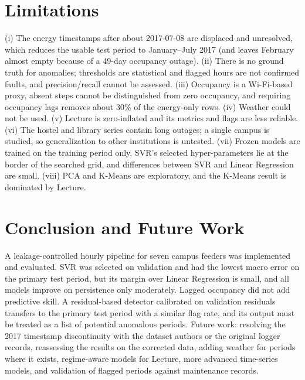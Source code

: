 \documentclass[conference]{IEEEtran}
\begin{document}
\section{Limitations}
(i) The energy timestamps after about 2017-07-08 are displaced and unresolved, which reduces the usable test period to January--July 2017 (and leaves February almost empty because of a 49-day occupancy outage).
(ii) There is no ground truth for anomalies; thresholds are statistical and flagged hours are not confirmed faults, and precision/recall cannot be assessed. (iii) Occupancy is a Wi-Fi-based proxy, absent steps cannot be distinguished from zero occupancy, and requiring occupancy lags removes about 30\% of the energy-only rows.
(iv) Weather could not be used. (v) Lecture is zero-inflated and its metrics and flags are less reliable. (vi) The hostel and library series contain long outages; a single campus is studied, so generalization to other institutions is untested.
(vii) Frozen models are trained on the training period only, SVR's selected hyper-parameters lie at the border of the searched grid, and differences between SVR and Linear Regression are small. (viii) PCA and K-Means are exploratory, and the K-Means result is dominated by Lecture.

\section{Conclusion and Future Work}
A leakage-controlled hourly pipeline for seven campus feeders was implemented and evaluated. SVR was selected on validation and had the lowest macro error on the primary test period, but its margin over Linear Regression is small, and all models improve on persistence only moderately.
Lagged occupancy did not add predictive skill. A residual-based detector calibrated on validation residuals transfers to the primary test period with a similar flag rate, and its output must be treated as a list of potential anomalous periods.
Future work: resolving the 2017 timestamp discontinuity with the dataset authors or the original logger records, reassessing the results on the corrected data, adding weather for periods where it exists, regime-aware models for Lecture, more advanced time-series models, and validation of flagged periods against maintenance records.



\end{document}
